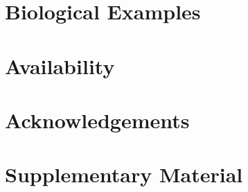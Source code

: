 \documentclass[oupdraft]{sysbio_sse}
\begin{document}
\lipsum[5]


\bigskip

\section{Biological Examples}
\label{sec:bio-examples}

\lipsum[6]

\bigskip

\section{Availability}
\label{sec:availability}

\lipsum[7]

\section{Acknowledgements}

\lipsum[8][1]

\section{Supplementary Material}

\lipsum[8][2]


\bigskip\bigskip





\end{document}
